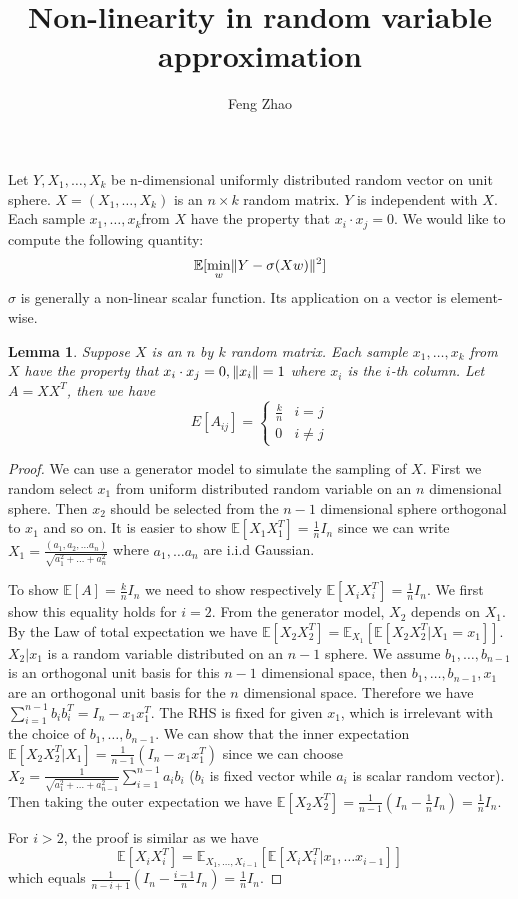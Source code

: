 \documentclass{article}
\title{Non-linearity in random variable approximation}
\author{Feng Zhao}
\DeclarePairedDelimiter\norm{\lVert}{\rVert}
\def\E{\mathbb{E}}
\newtheorem{lemma}{Lemma}
\begin{document}
\maketitle
Let $Y, X_1, \dots, X_k$ be n-dimensional uniformly distributed random vector on unit sphere. $X=(X_1, \dots, X_k)$ is an $n\times k$ random matrix. $Y$ is independent with $X$. Each sample $x_1, \dots, x_k$from $X$ have the property that $x_i \cdot x_j = 0$. We would like to compute the following quantity:
\begin{equation}\label{eq:Eminw}
\E[\min_w \norm{Y - \sigma (X w ) }^2]
\end{equation}
$\sigma$ is generally a non-linear scalar function. Its application on a vector is element-wise.
\begin{lemma}\label{lem:uniform}
Suppose $X$ is an $n$ by $k$ random matrix. Each sample $x_1, \dots, x_k$ from $X$ have the property that $x_i \cdot x_j = 0, \norm{x_i}=1$ where $x_i$ is the $i$-th column.  Let $A=X X^T$, then we have
\begin{equation}
E[A_{ij}]= \begin{cases}
\frac{k}{n} & i = j\\
0 & i\neq j 
\end{cases}
\end{equation}
\end{lemma}
\begin{proof}
We can use a generator model to simulate the sampling of $X$. First we random select $x_1$ from uniform distributed random variable on an $n$ dimensional sphere. Then $x_2$ should be selected from the $n-1$ dimensional sphere orthogonal to $x_1$ and so on.
It is easier to show $\E[X_1X_1^T] = \frac{1}{n} I_n$ since we can write $X_1 = \frac{(a_1, a_2, \dots a_n) }{\sqrt{a_1^2+\dots + a_n^2}}$ where $a_1, \dots a_n$ are i.i.d Gaussian.

To show $\E[A]=\frac{k}{n}I_n$ we need to show respectively $\E[X_iX_i^T]=\frac{1}{n} I_n$. We first show this equality holds for $i=2$. From the generator model, $X_2$ depends on $X_1$. By the Law of total expectation we have $\E[X_2 X_2^T] = \E_{X_1}[\E[X_2 X_2^T |X_1 = x_1]]$. $X_2 | x_1$ is a random variable distributed on an $n-1$ sphere. We assume $b_1, \dots, b_{n-1}$ is an orthogonal unit basis for this $n-1$ dimensional space,
then $b_1, \dots, b_{n-1}, x_1$ are an orthogonal unit basis for the $n$ dimensional space. Therefore we have
$\sum_{i=1}^{n-1} b_i b_i^T = I_n -  x_1 x_1^T $. The RHS is fixed for given $x_1$, which is irrelevant with the choice of $b_1, \dots, b_{n-1}$. We can show that the inner expectation $\E[X_2 X_2^T |X_1] = \frac{1}{n-1}(I_n - x_1 x_1^T)$ since we can choose $X_2 = \frac{1}{\sqrt{a_1^2 + \dots + a_{n-1}^2}} \sum_{i=1}^{n-1} a_i b_i$ ($b_i$ is fixed vector while $a_i$ is scalar random vector). Then taking the outer expectation we have $\E[X_2 X_2^T] = \frac{1}{n-1} (I_n - \frac{1}{n} I_n) = \frac{1}{n} I_n$.

For $i>2$, the proof is similar as we have $$
\E[X_i X_i^T] = \E_{X_1, \dots, X_{i-1}} [\E[X_i X_i^T | x_1, \dots x_{i-1}]]
$$
 which equals $\frac{1}{n-i+1}(I_n - \frac{i-1}{n} I_n) = \frac{1}{n} I_n$.
\end{proof}
\end{document}
